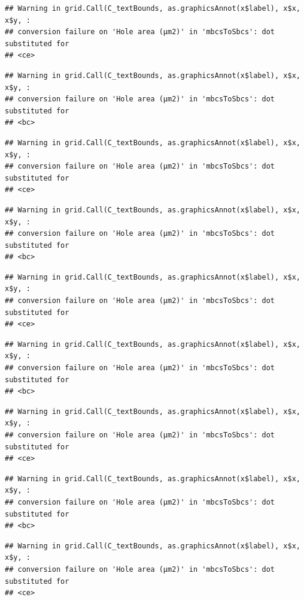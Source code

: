 \documentclass[
]{article}
\begin{document}
\begin{verbatim}
## Warning in grid.Call(C_textBounds, as.graphicsAnnot(x$label), x$x, x$y, :
## conversion failure on 'Hole area (μm2)' in 'mbcsToSbcs': dot substituted for
## <ce>
\end{verbatim}

\begin{verbatim}
## Warning in grid.Call(C_textBounds, as.graphicsAnnot(x$label), x$x, x$y, :
## conversion failure on 'Hole area (μm2)' in 'mbcsToSbcs': dot substituted for
## <bc>
\end{verbatim}

\begin{verbatim}
## Warning in grid.Call(C_textBounds, as.graphicsAnnot(x$label), x$x, x$y, :
## conversion failure on 'Hole area (μm2)' in 'mbcsToSbcs': dot substituted for
## <ce>
\end{verbatim}

\begin{verbatim}
## Warning in grid.Call(C_textBounds, as.graphicsAnnot(x$label), x$x, x$y, :
## conversion failure on 'Hole area (μm2)' in 'mbcsToSbcs': dot substituted for
## <bc>
\end{verbatim}

\begin{verbatim}
## Warning in grid.Call(C_textBounds, as.graphicsAnnot(x$label), x$x, x$y, :
## conversion failure on 'Hole area (μm2)' in 'mbcsToSbcs': dot substituted for
## <ce>
\end{verbatim}

\begin{verbatim}
## Warning in grid.Call(C_textBounds, as.graphicsAnnot(x$label), x$x, x$y, :
## conversion failure on 'Hole area (μm2)' in 'mbcsToSbcs': dot substituted for
## <bc>
\end{verbatim}

\begin{verbatim}
## Warning in grid.Call(C_textBounds, as.graphicsAnnot(x$label), x$x, x$y, :
## conversion failure on 'Hole area (μm2)' in 'mbcsToSbcs': dot substituted for
## <ce>
\end{verbatim}

\begin{verbatim}
## Warning in grid.Call(C_textBounds, as.graphicsAnnot(x$label), x$x, x$y, :
## conversion failure on 'Hole area (μm2)' in 'mbcsToSbcs': dot substituted for
## <bc>
\end{verbatim}

\begin{verbatim}
## Warning in grid.Call(C_textBounds, as.graphicsAnnot(x$label), x$x, x$y, :
## conversion failure on 'Hole area (μm2)' in 'mbcsToSbcs': dot substituted for
## <ce>
\end{verbatim}
\end{document}
